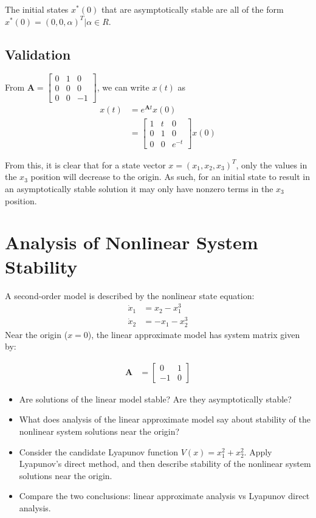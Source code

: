 \documentclass[]{article}
\begin{document}
The initial states $x^*(0)$ that are asymptotically stable are all of the form ${x^*(0) = (0, 0, \alpha)^T | \alpha \in \mathit{R}}$.

\subsection{Validation}

From $\mathbf{A} = \begin{bmatrix}
0 & 1 & 0 \\
0 & 0 & 0 \\
0 & 0 & -1
\end{bmatrix}$, we can write $x(t)$ as
\begin{align*}
	x(t) &= e^{\mathbf{A}t}x(0) \\
	&= \begin{bmatrix}
	1 & t & 0 \\
	0 & 1 & 0 \\
	0 & 0 & e^{-t}
	\end{bmatrix}x(0)
\end{align*}

From this, it is clear that for a state vector $x = (x_1, x_2, x_3)^T$, only the values in the $x_3$ position will decrease to the origin.
As such, for an initial state to result in an asymptotically stable solution it may only have nonzero terms in the $x_3$ position.

\section{Analysis of Nonlinear System Stability}

A second-order model is described by the nonlinear state equation:
\begin{align*}
	\dot{x}_1 &= x_2 - x_1^3 \\
	\dot{x}_2 &= -x_1 - x_2^3
\end{align*}
Near the origin ($x=0$), the linear approximate model has system matrix given by:

\begin{align*}
	\mathbf{A} &= \begin{bmatrix}
	0 & 1 \\
	-1 & 0
	\end{bmatrix}
\end{align*}

\begin{itemize}
	\item Are solutions of the linear model stable? Are they asymptotically stable?
	\item What does analysis of the linear approximate model say about stability of the nonlinear system solutions near the origin?
	\item Consider the candidate Lyapunov function $V(x) = x_1^2 + x_2^2$. Apply Lyapunov's direct method, and then describe stability of the nonlinear system solutions near the origin.
	\item Compare the two conclusions: linear approximate analysis vs Lyapunov direct analysis.
\end{itemize}
\end{document}
